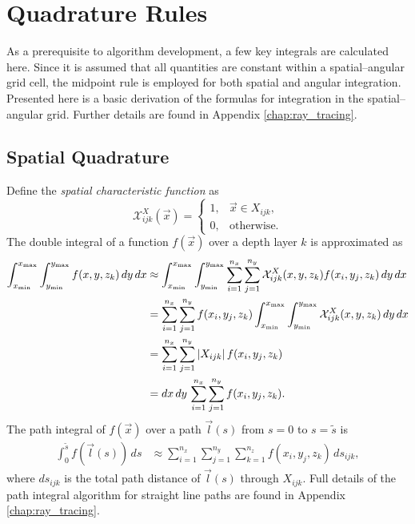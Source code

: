 \section{Quadrature Rules}
As a prerequisite to algorithm development, a few key integrals are calculated here.
Since it is assumed that all quantities are constant within a spatial--angular grid cell,
the midpoint rule is employed for both spatial and angular integration.
Presented here is a basic derivation of the formulas for integration in the spatial--angular grid.
Further details are found in Appendix \ref{chap:ray_tracing}.

\subsection{Spatial Quadrature}
Define the \textit{spatial characteristic function} as
\begin{equation*}
  \mathcal{X}^X_{ijk}(\vec{x}) = \begin{cases}
    1, & \vec{x} \in X_{ijk}, \\
    0, & \mbox{otherwise}.
  \end{cases}
\end{equation*}
The double integral of a function $f(\vec{x})$ over a depth layer $k$ is approximated as
\begin{align*}
  \int_{x_{\min}}^{x_{\max}}\int_{y_{\min}}^{y_{\max}} f(x, y, z_k)\, dy\, dx &\approx \int_{x_{\min}}^{x_{\max}} \int_{y_{\min}}^{y_{\max}} \sum_{i=1}^{n_x}\sum_{j=1}^{n_y} \mathcal{X}^X_{ijk}(x,y,z_k) f(x_i, y_j, z_k)\, dy\, dx \\
  &= \sum_{i=1}^{n_x}\sum_{j=1}^{n_y} f(x_i, y_j, z_k) \int_{x_{\min}}^{x_{\max}} \int_{y_{\min}}^{y_{\max}} \mathcal{X}^X_{ijk}(x,y,z_k) \, dy\, dx \\
  &= \sum_{i=1}^{n_x}\sum_{j=1}^{n_y} \left| X_{ijk} \right| f(x_i, y_j, z_k) \\
  &= dx\, dy\, \sum_{i=1}^{n_x}\sum_{j=1}^{n_y} f(x_i, y_j, z_k).
\end{align*}
The path integral of $f(\vec{x})$ over a path $\vec{l}(s)$ from $s=0$ to $s=\tilde{s}$ is
\begin{align*}
  \int_0^{\tilde{s}} f(\vec{l}(s))\, ds &\approx \sum_{i=1}^{n_x}\sum_{j=1}^{n_y}\sum_{k=1}^{n_z} f(x_i, y_j, z_k)\, ds_{ijk},
\end{align*}
where $ds_{ijk}$ is the total path distance of $\vec{l}(s)$ through $X_{ijk}$.
Full details of the path integral algorithm for straight line paths are found in Appendix \ref{chap:ray_tracing}.

